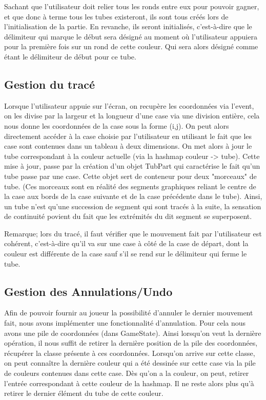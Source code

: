 \documentclass[12pt, a4paper]{article}%
\begin{document}
    Sachant que l'utilisateur doit relier tous les ronds entre eux pour pouvoir gagner, et que donc à terme tous les tubes
    existeront, ils sont tous créés lors de l'initialisation de la partie. En revanche, ils seront initialisés, c'est-à-dire que
    le délimiteur qui marque le début sera désigné au moment où l'utilisateur appuiera pour la première fois sur un rond de cette
    couleur. Qui sera alors désigné comme étant le délimiteur de début pour ce tube.
    \subsection{Gestion du tracé}
    Lorsque l'utilisateur appuie sur l'écran, on recupère les coordonnées via l'event, on les divise par la largeur et la longueur
    d'une case via une division entière, cela nous donne les coordonnées de la case sous la forme (i,j). On peut alors directement
    accéder à la case choisie par l'utilisateur en utilisant le fait que les case sont contenues dans un tableau à deux
    dimensions. On met alors à jour le tube correspondant à la couleur actuelle (via la hashmap couleur -> tube). Cette mise à
    jour, passe par la création d'un objet TubPart qui caractérise le fait qu'un tube passe par une case. Cette objet sert de
    conteneur pour deux "morceaux" de tube. (Ces morceaux sont en réalité des segments graphiques reliant le centre de la case aux
    bords de la case suivante et de la case précédente dans le tube). Ainsi, un tube n'est qu'une succession de segment qui sont
    tracés à la suite, la sensation de continuité povient du fait que les extrémités du dit segment se superposent.
    \newline

    Remarque; lors du tracé, il faut vérifier que le mouvement fait par l'utilisateur est cohérent, c'est-à-dire qu'il va sur une
    case à côté de la case de départ, dont la couleur est différente de la case sauf s'il se rend sur le délimiteur qui ferme le
    tube.
    
    \subsection{Gestion des Annulations/Undo}
    Afin de pouvoir fournir au joueur la possibilité d'annuler le dernier mouvement fait, nous avons implémenter une
    fonctionnalité d'annulation. Pour cela nous avons une pile de coordonnées (dans GameState). Ainsi lorsqu'on veut la dernière
    opération, il nous suffit de retirer la dernière position de la pile des coordonnées, récupérer la classe présente à ces
    coordonnées. Lorsqu'on arrive sur cette classe, on peut connaître la dernière couleur qui a été dessinée sur cette case via la
    pile de couleurs contenues dans cette case. Dès qu'on a la couleur, on peut, retirer l'entrée correspondant à cette couleur de
    la hashmap. Il ne reste alors plus qu'à retirer le dernier élément du tube de cette couleur.
    \newline
\end{document}
